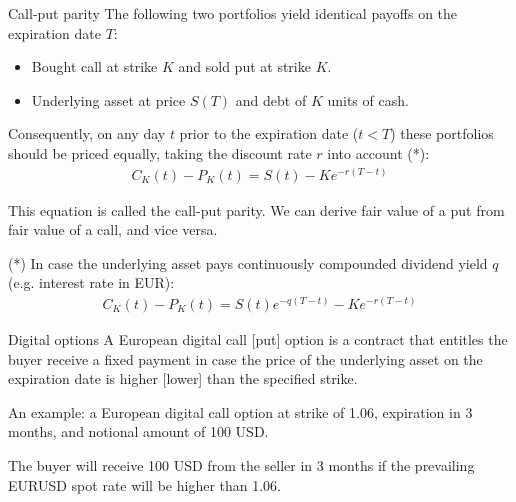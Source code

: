 \documentclass{beamer}
\begin{document}
\begin{frame}{Call-put parity}
\justify
The following two portfolios yield identical payoffs on the expiration date $T$:
\begin{itemize}
\justifying
\item Bought call at strike $K$ and sold put at strike $K$.
\item Underlying asset at price $S(T)$ and debt of $K$ units of cash.
\end{itemize}

\justify
Consequently, on any day $t$ prior to the expiration date ($t<T$) these portfolios should be priced equally, taking the discount rate $r$ into account (*):
\begin{align*}
C_K(t) - P_K(t) = S(t) - Ke^{-r(T-t)}
\end{align*}

\justify
This equation is called the \alert{call-put parity}. We can derive fair value of a put from fair value of a call, and vice versa.

\justify
(*) In case the underlying asset pays continuously compounded dividend yield $q$ (e.g. interest rate in EUR):
\begin{align*}
C_K(t) - P_K(t) = S(t)e^{-q(T-t)} - Ke^{-r(T-t)}
\end{align*}
\end{frame}



\begin{frame}{Digital options}
\justify
A European \alert{digital call [put]} option is a contract that entitles the buyer receive a fixed payment in case the price of the underlying asset on the expiration date is higher [lower] than the specified strike.

\justify
An example: a European digital call option at strike of 1.06, expiration in 3 months, and notional amount of 100 USD. 

\justify
The buyer will receive 100 USD from the seller in 3 months if the prevailing EURUSD spot rate will be higher than 1.06.
\end{frame}
\end{document}
